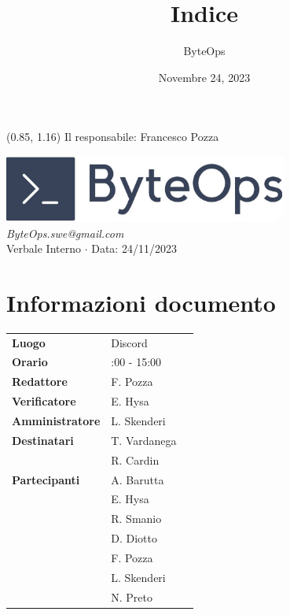 \documentclass{article}
\title{\textbf{\fontsize{28}{6}\selectfont Indice}}
\author{\fontsize{14}{6}\selectfont ByteOps}
\date{Novembre 24, 2023}
\begin{document}
\begin{textblock*}{\textwidth}(0.85\textwidth, 1.16\textheight)
    Il responsabile: Francesco Pozza
\end{textblock*}


\pagestyle{fancy}
\begin{center}
\includegraphics[width = 0.7\textwidth]{../../Images/logo.png} \\
\vspace{0.2cm}
\textcolor[RGB]{60, 60, 60}{\textit{ByteOps.swe@gmail.com}} \\
\vspace{1cm}
\fontsize{16}{6}\selectfont Verbale Interno $\cdot$ Data: 24/11/2023 \\
\vspace{0.5cm}
\end{center}

\section*{Informazioni documento}
\def\arraystretch{1.2}
\begin{tabular}{>{\raggedleft\arraybackslash}p{}|>{\raggedright\arraybackslash}p{}c}
\hline
\addlinespace
\textbf{Luogo} & Discord \vspace{10pt} \\
\textbf{Orario} &  14:00 - 15:00  \vspace{10pt} \\
\textbf{Redattore} & F. Pozza \vspace{10pt} \\
\textbf{Verificatore} & E. Hysa \vspace{10pt} \\
\textbf{Amministratore} & L. Skenderi \vspace{10pt} \\
\textbf{Destinatari} & T. Vardanega \\ & R. Cardin \vspace{10pt} \\
\textbf{Partecipanti} & A. Barutta \\ & E. Hysa \\ & R. Smanio \\ & D. Diotto \\ & F. Pozza \\ & L. Skenderi \\ & N. Preto \vspace{10pt} \\
\end{tabular}
\pagebreak 
\end{document}
